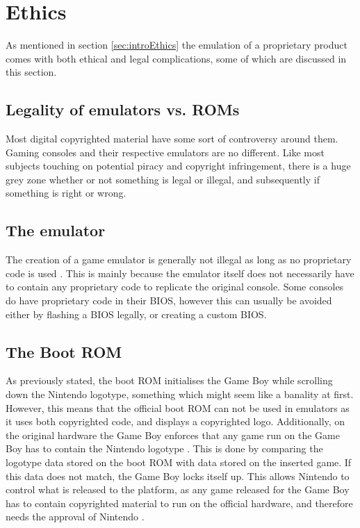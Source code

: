 \section{Ethics}
As mentioned in section \ref{sec:introEthics} the emulation of a proprietary product comes with both ethical and legal complications, some of which are discussed in this section.
\label{sec:Ethics}
\subsection{Legality of emulators vs. ROMs}
Most digital copyrighted material have some sort of controversy around them. Gaming consoles and their respective emulators are no different. Like most subjects touching on potential piracy and copyright infringement, there is a huge grey zone whether or not something is legal or illegal, and subsequently if something is right or wrong. 

\subsection{The emulator}
The creation of a game emulator is generally not illegal as long as no proprietary code is used \cite{emulatorLegal}. This is mainly because the emulator itself does not necessarily have to contain any proprietary code to replicate the original console. Some consoles do have proprietary code in their BIOS, however this can usually be avoided either by flashing a BIOS legally, or creating a custom BIOS. 

\subsection{The Boot ROM}
As previously stated, the boot ROM initialises the Game Boy while scrolling down the Nintendo logotype, something which might seem like a banality at first. However, this means that the official boot ROM can not be used in emulators as it uses both copyrighted code, and displays a copyrighted logo. Additionally, on the original hardware the Game Boy enforces that any game run on the Game Boy has to contain the Nintendo logotype \cite{GBTROM}. This is done by comparing the logotype data stored on the boot ROM with data stored on the inserted game. If this data does not match, the Game Boy locks itself up. This allows Nintendo to control what is released to the platform, as any game released for the Game Boy has to contain copyrighted material to run on the official hardware, and therefore needs the approval of Nintendo \cite{GBTROM}.

